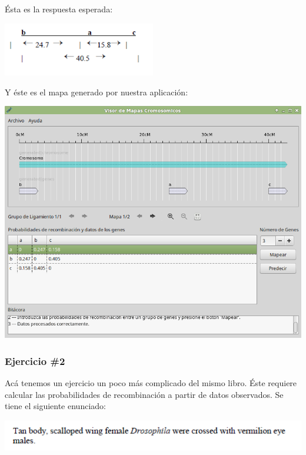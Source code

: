 \documentclass{article}
\begin{document}
	Ésta es la respuesta esperada:
	
	\begin{center}
		\includegraphics[width=0.5\textwidth]{images/e_2.png}
	\end{center}
	
	Y éste es el mapa generado por nuestra aplicación:
	
	\begin{center}
		\includegraphics[scale=0.5]{images/e_3.png}
	\end{center}
	
	\subsubsection{Ejercicio \#2}
	
	Acá tenemos un ejercicio un poco más complicado del mismo libro. Éste requiere calcular las probabilidades de recombinación a partir de datos observados. Se tiene el siguiente enunciado:
	
	\begin{center}
		\includegraphics[scale=0.8]{images/e_4.png}
	\end{center}
	
\end{document}
